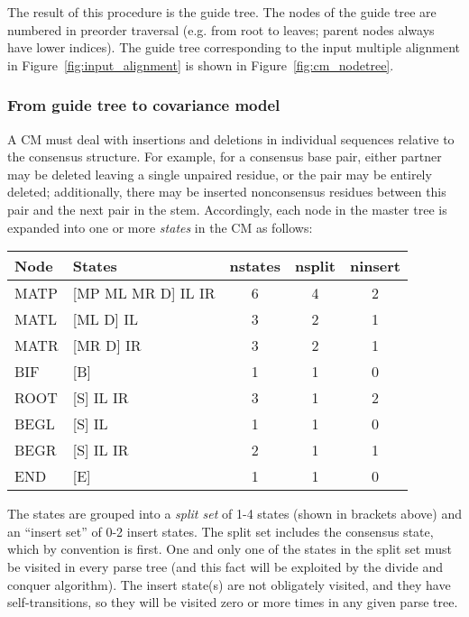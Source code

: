 \documentclass[11pt]{article}
\begin{document}
The result of this procedure is the guide tree. The nodes of the guide
tree are numbered in preorder traversal (e.g. from root to leaves;
parent nodes always have lower indices). The guide tree corresponding
to the input multiple alignment in Figure~\ref{fig:input_alignment} is
shown in Figure~\ref{fig:cm_nodetree}.

\subsubsection{From guide tree to covariance model}

A CM must deal with insertions and deletions in individual sequences
relative to the consensus structure. For example, for a consensus base
pair, either partner may be deleted leaving a single unpaired residue,
or the pair may be entirely deleted; additionally, there may be
inserted nonconsensus residues between this pair and the next pair in
the stem. Accordingly, each node in the master tree is expanded into
one or more \emph{states} in the CM as follows:

\vspace{0.5em}
\begin{tabular}{llccc}
Node   &  States             & nstates & nsplit & ninsert \\ \hline
MATP   & [MP ML MR D] IL IR  &   6     &   4    &  2   \\
MATL   & [ML D] IL           &   3     &   2    &  1   \\
MATR   & [MR D] IR           &   3     &   2    &  1   \\
BIF    & [B]                 &   1     &   1    &  0   \\
ROOT   & [S] IL IR           &   3     &   1    &  2   \\
BEGL   & [S] IL              &   1     &   1    &  0   \\
BEGR   & [S] IL IR           &   2     &   1    &  1   \\
END    & [E]                 &   1     &   1    &  0   \\ \hline
\end{tabular}
\vspace{0.5em}

The states are grouped into a \emph{split set} of 1-4 states (shown in
brackets above) and an ``insert set'' of 0-2 insert states. The split
set includes the consensus state, which by convention is first. One
and only one of the states in the split set must be visited in every
parse tree (and this fact will be exploited by the divide and conquer
algorithm). The insert state(s) are not obligately visited, and they
have self-transitions, so they will be visited zero or more times in
any given parse tree.
\end{document}
